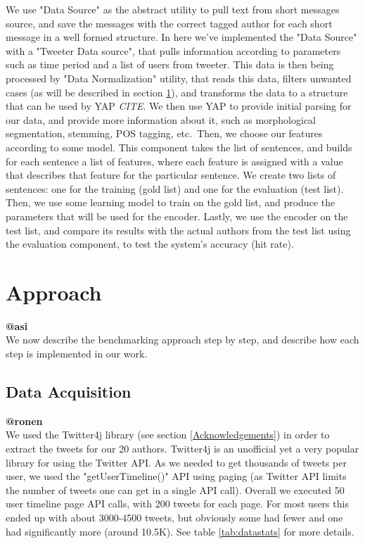 \documentclass[a4paper]{article}
\begin{document}
We use "Data Source" as the abstract utility to pull text from short messages source, and save the messages with the correct tagged author for each short message in a well formed structure.
In here we've implemented the "Data Source" with a "Tweeter Data source", that pulls information according to parameters such as time period and a list of users from tweeter.
This data is then being processed by "Data Normalization" utility, that reads this data, filters unwanted cases (as will be described in section \ref{Approach}), and transforms the data to a structure that can be used by YAP \emph{CITE}.
We then use YAP to provide initial parsing for our data, and provide more information about it, such as morphological segmentation, stemming, POS tagging, etc.\
Then, we choose our features according to some model. This component takes the list of sentences, and builds for each sentence a list of features, where each feature is assigned with a value that describes that feature for the particular sentence.
We create two lists of sentences: one for the training (gold list) and one for the evaluation (test list).
Then, we use some learning model to train on the gold list, and produce the parameters that will be used for the encoder.
Lastly, we use the encoder on the test list, and compare its results with the actual authors from the test list using the evaluation component, to test the system's accuracy (hit rate).

\section{Approach}
\label{Approach}
\textbf{@asi}\\
We now describe the benchmarking approach step by step, and describe how each step is implemented in our work.
\subsection{Data Acquisition}
\textbf{@ronen}\\
We used the Twitter4j library (see section \ref{Acknowledgements}) in order to extract the tweets for our 20 authors. Twitter4j is an unofficial yet a very popular library for using the Twitter API. As we needed to get thousands of tweets per user, we used the "getUserTimeline()" API using paging (as Twitter API limits the number of tweets one can get in a single API call). Overall we executed 50 user timeline page API calls, with 200 tweets for each page. For most users this ended up with about 3000-4500 tweets, but obviously some had fewer and one had significantly more (around 10.5K). See table \ref{tab:datastats} for more details.
\end{document}
